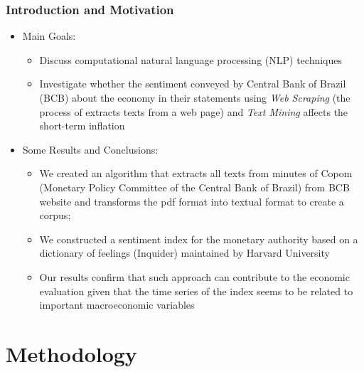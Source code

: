 \documentclass[aspectratio=169]{beamer}
\begin{document}
\begin{frame}\frametitle{Introduction and Motivation}
  \begin{itemize}
  \item Main Goals:
    \begin{itemize}
    	\item Discuss computational natural
    	language processing (NLP) techniques
    	\item Investigate whether the
    	sentiment conveyed by Central Bank of Brazil (BCB) about the economy in their statements using \emph{Web Scraping} (the process of extracts texts from a web page) and \emph{Text Mining} affects the short-term inflation 
    \end{itemize}
  \item Some Results and Conclusions:
    \begin{itemize}
      \item We created an algorithm that extracts all texts from minutes of Copom (Monetary Policy Committee of the Central Bank of Brazil) from BCB website and transforms the pdf format into textual format to create a corpus;
      \item We constructed a sentiment index for the monetary authority based on a dictionary of feelings (Inquider) maintained by Harvard
      University
      \item Our results confirm that such approach can contribute to the economic evaluation given that the time series of the index seems to be related to important macroeconomic variables
    \end{itemize}
  \end{itemize}
\end{frame}


\section{Methodology}
\end{document}
